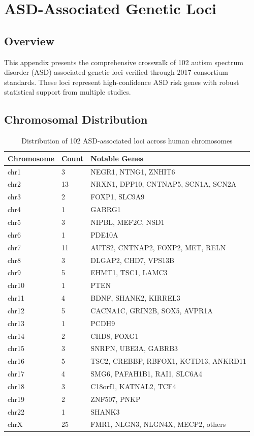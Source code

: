 \documentclass[12pt]{article}
\begin{document}
\section{ASD-Associated Genetic Loci}

\subsection{Overview}
This appendix presents the comprehensive crosswalk of 102 autism spectrum disorder (ASD) associated genetic loci verified through 2017 consortium standards. These loci represent high-confidence ASD risk genes with robust statistical support from multiple studies.

\subsection{Chromosomal Distribution}

\begin{table}[h]
\centering
\caption{Distribution of 102 ASD-associated loci across human chromosomes}
\begin{tabular}{lll}
\toprule
\textbf{Chromosome} & \textbf{Count} & \textbf{Notable Genes} \\
\midrule
chr1 & 3 & NEGR1, NTNG1, ZNHIT6 \\
chr2 & 13 & NRXN1, DPP10, CNTNAP5, SCN1A, SCN2A \\
chr3 & 2 & FOXP1, SLC9A9 \\
chr4 & 1 & GABRG1 \\
chr5 & 3 & NIPBL, MEF2C, NSD1 \\
chr6 & 1 & PDE10A \\
chr7 & 11 & AUTS2, CNTNAP2, FOXP2, MET, RELN \\
chr8 & 3 & DLGAP2, CHD7, VPS13B \\
chr9 & 5 & EHMT1, TSC1, LAMC3 \\
chr10 & 1 & PTEN \\
chr11 & 4 & BDNF, SHANK2, KIRREL3 \\
chr12 & 5 & CACNA1C, GRIN2B, SOX5, AVPR1A \\
chr13 & 1 & PCDH9 \\
chr14 & 2 & CHD8, FOXG1 \\
chr15 & 3 & SNRPN, UBE3A, GABRB3 \\
chr16 & 5 & TSC2, CREBBP, RBFOX1, KCTD13, ANKRD11 \\
chr17 & 4 & SMG6, PAFAH1B1, RAI1, SLC6A4 \\
chr18 & 3 & C18orf1, KATNAL2, TCF4 \\
chr19 & 2 & ZNF507, PNKP \\
chr22 & 1 & SHANK3 \\
chrX & 25 & FMR1, NLGN3, NLGN4X, MECP2, others \\
\bottomrule
\end{tabular}
\end{table}
\end{document}
